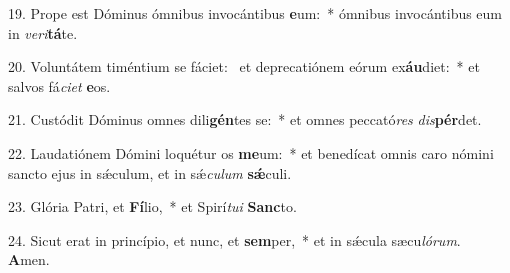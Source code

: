 19. Prope est Dóminus ómnibus invocántibus \textbf{e}um:~*  ómnibus invocántibus eum in \textit{ve}\textit{ri}\textbf{tá}te.\

20. Voluntátem timéntium se fáciet: \dag\  et deprecatiónem eórum ex\textbf{áu}diet:~*  et salvos fá\textit{ci}\textit{et} \textbf{e}os.\

21. Custódit Dóminus omnes dili\textbf{gén}tes se:~*  et omnes peccató\textit{res} \textit{dis}\textbf{pér}det.\

22. Laudatiónem Dómini loquétur os \textbf{me}um:~*  et benedícat omnis caro nómini sancto ejus in sǽculum, et in sǽ\textit{cu}\textit{lum} \textbf{sǽ}culi.\

23. Glória Patri, et \textbf{Fí}lio,~*  et Spirí\textit{tu}\textit{i} \textbf{Sanc}to.\

24. Sicut erat in princípio, et nunc, et \textbf{sem}per,~*  et in sǽcula sæcu\textit{ló}\textit{rum}. \textbf{A}men.\

